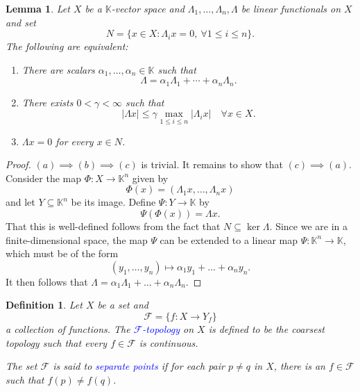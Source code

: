 \documentclass[11pt]{article}
\theoremstyle{thmstyle}
\newtheorem{lemma}[theorem]{Lemma}
\theoremstyle{defstyle}
\newtheorem{definition}[theorem]{Definition}
\newcommand{\R}{\mathbb{R}}
\newcommand{\bbC}{\mathbb{C}}
\newcommand{\K}{\mathbb{K}} %
\newcommand{\scrF}{\mathscr F}
\newcommand{\define}[1]{\textcolor{blue}{\textit{#1}}}
\renewcommand{\le}{\leqslant}
\begin{document}
\begin{lemma}
    Let $X$ be a $\K$-vector space and $\Lambda_1,\dots,\Lambda_n,\Lambda$ be linear functionals on $X$ and set 
    \begin{equation*}
        N = \{x\in X\colon \Lambda_i x = 0,~\forall 1\le i\le n\}.
    \end{equation*}
    The following are equivalent: 
    \begin{enumerate}[label=(\alph*)]
        \item There are scalars $\alpha_1,\dots,\alpha_n\in\K$ such that 
        \begin{equation*}
            \Lambda = \alpha_1\Lambda_1 + \cdots + \alpha_n\Lambda_n.
        \end{equation*}
        \item There exists $0 < \gamma < \infty$ such that 
        \begin{equation*}
            |\Lambda x|\le\gamma\max_{1\le i\le n}|\Lambda_i x|\quad\forall x\in X.
        \end{equation*}
        \item $\Lambda x = 0$ for every $x\in N$.
    \end{enumerate}
\end{lemma}
\begin{proof}
    $(a)\implies(b)\implies(c)$ is trivial. It remains to show that $(c)\implies(a)$. Consider the map $\Phi: X\to\K^n$ given by 
    \begin{equation*}
        \Phi(x) = \left(\Lambda_1 x,\dots,\Lambda_n x\right)
    \end{equation*}
    and let $Y\subseteq\K^n$ be its image. Define $\Psi: Y\to\K$ by 
    \begin{equation*}
        \Psi(\Phi(x)) = \Lambda x.
    \end{equation*}
    That this is well-defined follows from the fact that $N\subseteq\ker\Lambda$. Since we are in a finite-dimensional space, the map $\Psi$ can be extended to a linear map $\Psi:\K^n\to\K$, which must be of the form 
    \begin{equation*}
        (y_1,\dots, y_n)\mapsto\alpha_1y_1 + \dots + \alpha_n y_n.
    \end{equation*}
    It then follows that $\Lambda = \alpha_1\Lambda_1 + \dots + \alpha_n\Lambda_n$.
\end{proof}

\begin{definition}
    Let $X$ be a set and 
    \begin{equation*}
        \scrF = \{f: X\to Y_f\}
    \end{equation*}
    a collection of functions. The \define{$\scrF$-topology} on $X$ is defined to be the coarsest topology such that every $f\in\scrF$ is continuous.

    The set $\scrF$ is said to \define{separate points} if for each pair $p\ne q$ in $X$, there is an $f\in\scrF$ such that $f(p)\ne f(q)$.
\end{definition}
\end{document}
